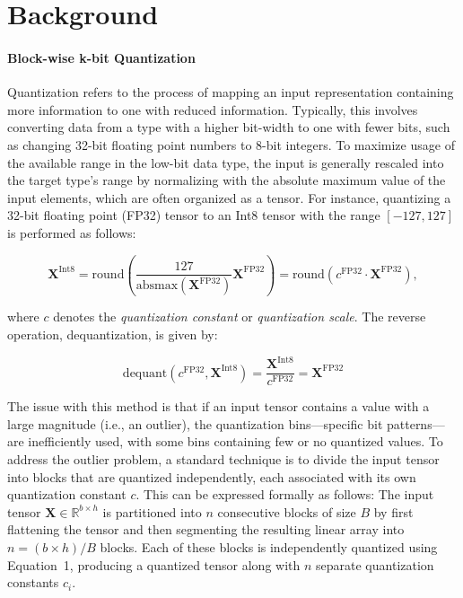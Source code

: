 \section{Background}
\paragraph{Block-wise k-bit Quantization} Quantization refers to the process of mapping an input representation containing more information to one with reduced information. Typically, this involves converting data from a type with a higher bit-width to one with fewer bits, such as changing 32-bit floating point numbers to 8-bit integers. To maximize usage of the available range in the low-bit data type, the input is generally rescaled into the target type’s range by normalizing with the absolute maximum value of the input elements, which are often organized as a tensor. For instance, quantizing a 32-bit floating point (FP32) tensor to an Int8 tensor with the range $[-127, 127]$ is performed as follows:

\begin{equation}
    \mathbf{X}^{ \text{Int8}} = \text{round}\left( \frac{127}{{\text{absmax}}(\mathbf{X}^{{\text{FP32}}})}\mathbf{X}^{{\text{FP32}}} \right) = \text{round}(c^{\text{FP32}}\cdot \mathbf{X}^{{\text{FP32}}}),
\end{equation}

where $c$ denotes the {\em quantization constant} or {\em quantization scale}. The reverse operation, dequantization, is given by:

\begin{equation}
    \text{dequant}(c^{\text{FP32}}, \mathbf{X}^{\text{Int8}}) = \frac{\mathbf{X}^{\text{Int8}}}{c^{\text{FP32}}} = \mathbf{X}^{\text{FP32}}
\end{equation}

The issue with this method is that if an input tensor contains a value with a large magnitude (i.e., an outlier), the quantization bins—specific bit patterns—are inefficiently used, with some bins containing few or no quantized values. To address the outlier problem, a standard technique is to divide the input tensor into blocks that are quantized independently, each associated with its own quantization constant $c$. This can be expressed formally as follows: The input tensor $\mathbf{X}\in \mathbb{R}^{b\times h}$ is partitioned into $n$ consecutive blocks of size $B$ by first flattening the tensor and then segmenting the resulting linear array into ${n = ({b\times h})/{B}}$ blocks. Each of these blocks is independently quantized using Equation~1, producing a quantized tensor along with $n$ separate quantization constants $c_i$.

